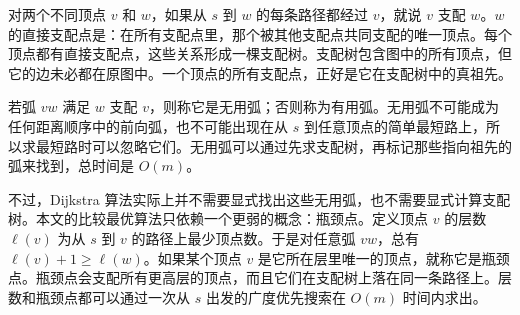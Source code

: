 \documentclass[UTF8]{ctexart}
\begin{document}
对两个不同顶点 $v$ 和 $w$，如果从 $s$ 到 $w$ 的每条路径都经过 $v$，就说 $v$ 支配 $w$。$w$ 的直接支配点是：在所有支配点里，那个被其他支配点共同支配的唯一顶点。每个顶点都有直接支配点，这些关系形成一棵支配树。支配树包含图中的所有顶点，但它的边未必都在原图中。一个顶点的所有支配点，正好是它在支配树中的真祖先。

若弧 $vw$ 满足 $w$ 支配 $v$，则称它是无用弧；否则称为有用弧。无用弧不可能成为任何距离顺序中的前向弧，也不可能出现在从 $s$ 到任意顶点的简单最短路上，所以求最短路时可以忽略它们。无用弧可以通过先求支配树，再标记那些指向祖先的弧来找到，总时间是 $O(m)$。

不过，Dijkstra 算法实际上并不需要显式找出这些无用弧，也不需要显式计算支配树。本文的比较最优算法只依赖一个更弱的概念：瓶颈点。定义顶点 $v$ 的层数 $\ell(v)$ 为从 $s$ 到 $v$ 的路径上最少顶点数。于是对任意弧 $vw$，总有 $\ell(v)+1\ge \ell(w)$。如果某个顶点 $v$ 是它所在层里唯一的顶点，就称它是瓶颈点。瓶颈点会支配所有更高层的顶点，而且它们在支配树上落在同一条路径上。层数和瓶颈点都可以通过一次从 $s$ 出发的广度优先搜索在 $O(m)$ 时间内求出。
\end{document}
